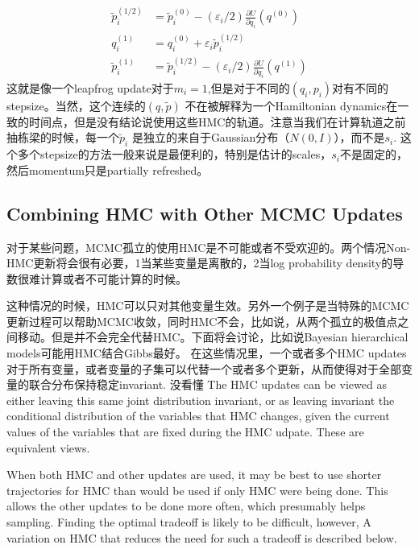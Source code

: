 \documentclass[
]{book}
\theoremstyle{definition}
\theoremstyle{definition}
\theoremstyle{definition}
\theoremstyle{remark}
\begin{document}
\[
\begin{aligned} \tilde{p}_{i}^{(1 / 2)} &=\tilde{p}_{i}^{(0)}-\left(\varepsilon_{i} / 2\right) \frac{\partial U}{\partial q_{i}}\left(q^{(0)}\right) \\ q_{i}^{(1)} &=q_{i}^{(0)}+\varepsilon_{i} \tilde{p}_{i}^{(1 / 2)} \\ \tilde{p}_{i}^{(1)} &=\tilde{p}_{i}^{(1 / 2)}-\left(\varepsilon_{i} / 2\right) \frac{\partial U}{\partial q_{i}}\left(q^{(1)}\right) \end{aligned}
\]
这就是像一个leapfrog update对于\(m_i=1\),但是对于不同的\((q_i,p_i)\)对有不同的stepsize。当然，这个连续的\((q,\tilde p)\) 不在被解释为一个Hamiltonian dynamics在一致的时间点，但是没有结论说使用这些HMC的轨道。注意当我们在计算轨道之前抽栋梁的时候，每一个\(\tilde p_i\) 是独立的来自于Gaussian分布（\(N(0,I)\)），而不是\(s_i\).
这个多个stepsize的方法一般来说是最便利的，特别是估计的scales，\(s_i\)不是固定的，然后momentum只是partially refreshed。

\hypertarget{combining-hmc-with-other-mcmc-updates}{%
\subsection{Combining HMC with Other MCMC Updates}\label{combining-hmc-with-other-mcmc-updates}}

对于某些问题，MCMC孤立的使用HMC是不可能或者不受欢迎的。两个情况Non-HMC更新将会很有必要，1当某些变量是离散的，2当log probability density的导数很难计算或者不可能计算的时候。

这种情况的时候，HMC可以只对其他变量生效。另外一个例子是当特殊的MCMC更新过程可以帮助MCMC收敛，同时HMC不会，比如说，从两个孤立的极值点之间移动。但是并不会完全代替HMC。下面将会讨论，比如说Bayesian hierarchical models可能用HMC结合Gibbs最好。
在这些情况里，一个或者多个HMC updates对于所有变量，或者变量的子集可以代替一个或者多个更新，从而使得对于全部变量的联合分布保持稳定invariant.
没看懂
The HMC updates can be viewed as either leaving this same joint distribution invariant, or as leaving invariant the conditional distribution of the variables that HMC changes, given the current values of the variables that are fixed during the HMC udpate. These are equivalent views.

When both HMC and other updates are used, it may be best to use shorter trajectories for HMC than would be used if only HMC were being done. This allows the other updates to be done more often, which presumably helps sampling. Finding the optimal tradeoff is likely to be difficult, however, A variation on HMC that reduces the need for such a tradeoff is described below.
\end{document}
